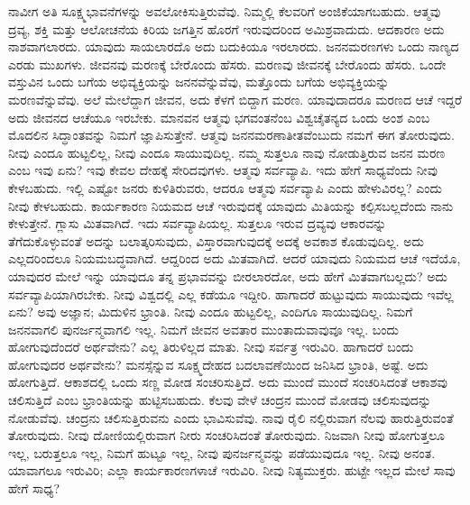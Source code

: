 ನಾವೀಗ ಅತಿ ಸೂಕ್ಷ್ಮಭಾವನೆಗಳನ್ನು ಅವಲೋಕಿಸುತ್ತಿರುವೆವು. ನಿಮ್ಮಲ್ಲಿ ಕೆಲವರಿಗೆ ಅಂಜಿಕೆಯಾಗಬಹುದು. ಆತ್ಮವು ದ್ರವ್ಯ, ಶಕ್ತಿ ಮತ್ತು ಆಲೋಚನೆಯ ಕಿರಿಯ ಜಗತ್ತಿನ ಹೊರಗೆ ಇರುವುದರಿಂದ ಅಮಿಶ್ರವಾದುದು. ಆದಕಾರಣ ಅದು ನಾಶವಾಗಲಾರದು. ಯಾವುದು ಸಾಯಲಾರದೊ ಅದು ಬದುಕಿಯೂ ಇರಲಾರದು. ಜನನಮರಣಗಳು ಒಂದು ನಾಣ್ಯದ ಎರಡು ಮುಖಗಳು. ಜೀವನವು ಮರಣಕ್ಕೆ ಬೇರೊಂದು ಹೆಸರು. ಮರಣವು ಜೀವನಕ್ಕೆ ಬೇರೊಂದು ಹೆಸರು. ಒಂದೇ ವಸ್ತುವಿನ ಒಂದು ಬಗೆಯ ಅಭಿವ್ಯಕ್ತಿಯನ್ನು ಜನನವೆನ್ನುವೆವು, ಮತ್ತೊಂದು ಬಗೆಯ ಅಭಿವ್ಯಕ್ತಿಯನ್ನು ಮರಣವೆನ್ನುವೆವು. ಅಲೆ ಮೇಲೆದ್ದಾಗ ಜೀವನ, ಅದು ಕೆಳಗೆ ಬಿದ್ದಾಗ ಮರಣ. ಯಾವುದಾದರೂ ಮರಣದ ಆಚೆ ಇದ್ದರೆ ಅದು ಜೀವನದ ಆಚೆಯೂ ಇರಬೇಕು. ಮಾನವನ ಆತ್ಮವು ಭಗವಂತನೆಂಬ ವಿಶ್ವಚೈತನ್ಯದ ಒಂದು ಅಂಶ ಎಂಬ ಮೊದಲಿನ ಸಿದ್ಧಾಂತವನ್ನು ನಿಮಗೆ ಜ್ಞಾಪಿಸುತ್ತೇನೆ. ಆತ್ಮವು ಜನನಮರಣಾತೀತವೆಂಬುದು ನಮಗೆ ಈಗ ತೋರುವುದು. ನೀವು ಎಂದೂ ಹುಟ್ಟಲಿಲ್ಲ, ನೀವು ಎಂದೂ ಸಾಯುವುದಿಲ್ಲ. ನಮ್ಮ ಸುತ್ತಲೂ ನಾವು ನೋಡುತ್ತಿರುವ ಜನನ ಮರಣ ಎಂಬ ಇವು ಏನು? ಇವು ಕೇವಲ ದೇಹಕ್ಕೆ ಸೇರಿದವುಗಳು. ಆತ್ಮವು ಸರ್ವವ್ಯಾಪಿ. ಇದು ಹೇಗೆ ಸಾಧ್ಯವೆಂದು ನೀವು ಕೇಳಬಹುದು. ಇಲ್ಲಿ ಎಷ್ಟೋ ಜನರು ಕುಳಿತಿರುವರು, ಆದರೂ ಆತ್ಮವು ಸರ್ವವ್ಯಾಪಿ ಎಂದು ಹೇಳುವಿರಲ್ಲ? ಎಂದು ನೀವು ಕೇಳಬಹುದು. ಕಾರ್ಯಕಾರಣ ನಿಯಮದ ಆಚೆ ಇರುವುದಕ್ಕೆ ಯಾವುದು ಮಿತಿಯನ್ನು ಕಲ್ಪಿಸಬಲ್ಲದೆಂದು ನಾನು ಕೇಳುತ್ತೇನೆ. ಗ್ಲಾಸು ಮಿತವಾಗಿದೆ. ಇದು ಸರ್ವವ್ಯಾಪಿಯಲ್ಲ. ಸುತ್ತಲೂ ಇರುವ ದ್ರವ್ಯವು ಆಕಾರವನ್ನು ತೆಗೆದುಕೊಳ್ಳುವಂತೆ ಅದನ್ನು ಬಲಾತ್ಕರಿಸುವುದು, ವಿಸ್ತಾರವಾಗುವುದಕ್ಕೆ ಅದಕ್ಕೆ ಅವಕಾಶ ಕೊಡುವುದಿಲ್ಲ. ಅದು ಎಲ್ಲದರಿಂದಲೂ ನಿಯಮಬದ್ಧವಾಗಿದೆ. ಆದ್ದರಿಂದ ಅದು ಮಿತವಾಗಿದೆ. ಆದರೆ ಯಾವುದು ನಿಯಮದ ಆಚೆ ಇದೆಯೊ, ಯಾವುದರ ಮೇಲೆ ಇನ್ನು ಯಾವುದೂ ತನ್ನ ಪ್ರಭಾವವನ್ನು ಬೀರಲಾರದೋ, ಅದು ಹೇಗೆ ಮಿತವಾಗಬಲ್ಲದು? ಅದು ಸರ್ವವ್ಯಾಪಿಯಾಗಿರಬೇಕು. ನೀವು ವಿಶ್ವದಲ್ಲಿ ಎಲ್ಲ ಕಡೆಯೂ ಇದ್ದೀರಿ. ಹಾಗಾದರೆ ಹುಟ್ಟುವುದು ಸಾಯುವುದು ಇವೆಲ್ಲ ಏನು? ಅವು ಅಜ್ಞಾನ; ಮಿದುಳಿನ ಭ್ರಾಂತಿ. ನೀವು ಎಂದೂ ಹುಟ್ಟಲಿಲ್ಲ, ಎಂದಿಗೂ ಸಾಯುವುದಿಲ್ಲ. ನಿಮಗೆ ಜನನವಾಗಲಿ ಪುನರ್ಜನ್ಮವಾಗಲಿ ಇಲ್ಲ. ನಿಮಗೆ ಜೀವನ ಅವತಾರ ಮುಂತಾದುವಾವುವೂ ಇಲ್ಲ. ಬಂದು ಹೋಗುವುದೆಂದರೆ ಅರ್ಥವೇನು? ಎಲ್ಲ ತಿರುಳಿಲ್ಲದ ಮಾತು. ನೀವು ಸರ್ವತ್ರ ಇರುವಿರಿ. ಹಾಗಾದರೆ ಬಂದು ಹೋಗುವುದರ ಅರ್ಥವೇನು? ಮನಸ್ಸೆನ್ನುವ ಸೂಕ್ಷ್ಮದೇಹದ ಬದಲಾವಣೆಯಿಂದ ಜನಿಸಿದ ಭ್ರಾಂತಿ, ಅಷ್ಟೆ. ಅದು ಹೋಗುತ್ತಿದೆ. ಆಕಾಶದಲ್ಲಿ ಒಂದು ಸಣ್ಣ ಮೋಡ ಸಂಚರಿಸುತ್ತಿದೆ. ಅದು ಮುಂದೆ ಮುಂದೆ ಸಂಚರಿಸಿದಂತೆ ಆಕಾಶವು ಚಲಿಸುತ್ತಿದೆ ಎಂಬ ಭ್ರಾಂತಿಯನ್ನು ಹುಟ್ಟಿಸಬಹುದು. ಕೆಲವು ವೇಳೆ ಚಂದ್ರನ ಮುಂದೆ ಮೋಡವು ಚಲಿಸುವುದನ್ನು ನೋಡುವೆವು. ಚಂದ್ರನು ಚಲಿಸುತ್ತಿರುವನು ಎಂದು ಭಾವಿಸುವೆವು. ನಾವು ರೈಲಿ ನಲ್ಲಿರುವಾಗ ನೆಲವು ಹಾರುತ್ತಿರುವಂತೆ ತೋರುವುದು. ನೀವು ದೋಣಿಯಲ್ಲಿರುವಾಗ ನೀರು ಸಂಚರಿಸಿದಂತೆ ತೋರುವುದು. ನಿಜವಾಗಿ ನೀವು ಹೋಗುತ್ತಲೂ ಇಲ್ಲ, ಬರುತ್ತಲೂ ಇಲ್ಲ, ನಿಮಗೆ ಹುಟ್ಟೂ ಇಲ್ಲ, ನೀವು ಪುನರ್ಜನ್ಮವನ್ನು ಪಡೆಯುವುದೂ ಇಲ್ಲ. ನೀವು ಅನಂತ. ಯಾವಾಗಲೂ ಇರುವಿರಿ; ಎಲ್ಲಾ ಕಾರ್ಯಕಾರಣಗಳಾಚೆ ಇರುವಿರಿ. ನೀವು ನಿತ್ಯಮುಕ್ತರು. ಹುಟ್ಟೇ ಇಲ್ಲದ ಮೇಲೆ ಸಾವು ಹೇಗೆ ಸಾಧ್ಯ?

